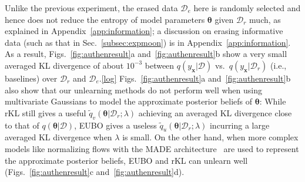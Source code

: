 \documentclass{article}
\theoremstyle{definition}
\newcommand{\mbf}[1]{\mathbf{#1}}
\newcommand{\mcl}[1]{\mathcal{#1}}
\newcommand{\da}{\mcl{D}}
\newcommand{\dc}{\mcl{D}_r}
\newcommand{\dr}{\mcl{D}_e}
\newcommand{\eubo}{\tilde{q}_u}
\newcommand{\elbo}{\tilde{q}_v}
\begin{document}
Unlike the previous experiment, the erased data $\dr$ here is randomly selected and hence does not reduce the entropy of model parameters $\bm{\theta}$ given $\dc$ much, as explained in Appendix~\ref{app:information};
a discussion on erasing informative data (such as that in Sec.~\ref{subsec:expmoon}) is in Appendix~\ref{app:information}.
As a result, Figs.~\ref{fig:authenresult}a and~\ref{fig:authenresult}b show a very small averaged KL divergence of about $10^{-3}$ between $q(y_{\mbf{x}}|\da)$ vs.~$q(y_{\mbf{x}}|\dc)$ 
(i.e., baselines) over $\dc$ and $\dr$.\cref{log}
Figs.~\ref{fig:authenresult}a and~\ref{fig:authenresult}b
also show that our unlearning methods do not perform well 
when using multivariate Gaussians to model the approximate posterior beliefs of $\bm{\theta}$:
While rKL still gives a useful $\elbo(\bm{\theta}|\dc; \lambda)$ achieving an averaged KL divergence close to that of $q(\bm{\theta}|\da)$,
EUBO gives a useless $\eubo(\bm{\theta}|\dc; \lambda)$ incurring a large averaged KL divergence 
when $\lambda$ is small. %
On the other hand, when 
more complex models like  normalizing flows with the MADE architecture~\cite{papamakarios2017masked} are used to represent the approximate posterior beliefs, EUBO and rKL can unlearn well (Figs.~\ref{fig:authenresult}c and~\ref{fig:authenresult}d).
%
\end{document}
